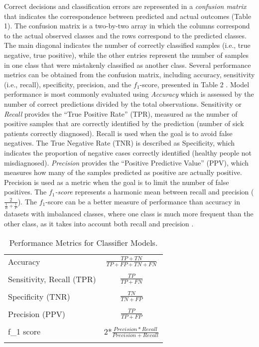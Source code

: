 \documentclass[sigconf]{acmart}
\begin{document}
Correct decisions and classification errors are represented in a 
\emph{confusion matrix} that indicates the correspondence between predicted 
and actual outcomes (Table 1). The confusion matrix is a two-by-two array in 
which the columns correspond to the actual observed classes and the rows 
correspond to the predicted classes. The main diagonal indicates the number 
of correctly classified samples (i.e., true negative, true positive), while 
the other entries represent the number of samples in one class that were 
mistakenly classified as another class. Several performance metrics can be 
obtained from the confusion matrix, including accuracy, sensitivity (i.e., 
recall), specificity, precision, and the $f_1$-score, presented in Table 2 
\cite{kuhn13, wiki18}. Model performance is most commonly evaluated using 
\emph{Accuracy} which is assessed by the number of correct predictions 
divided by the total observations. Sensitivity or \emph{Recall} provides the 
``True Positive Rate'' (TPR), measured as the number of positive samples that 
are correctly identified by the prediction (number of sick patients correctly
diagnosed). Recall is used when the goal is to avoid false negatives. The 
True Negative Rate (TNR) is described as Specificity, which indicates the 
proportion of negative cases correctly identified (healthy people not 
misdiagnosed). \emph{Precision} provides the ``Positive Predictive Value'' 
(PPV), which measures how many of the samples predicted as positive are 
actually positive. Precision is used as a metric when the goal is to limit
the number of false positives. The \emph{$f_1$-score} represents a harmonic 
mean between recall and precision (\(\frac{2}{ \frac{1}{R} + \frac{1}{P} }\)). 
The $f_1$-score can be a better measure of performance than accuracy in 
datasets with imbalanced classes, where one class is much more frequent 
than the other class, as it takes into account both recall and precision 
\cite{muller17, yun09}.


\begin{table}
  \caption{Performance Metrics for Classifier Models.}
  \label{tab:freq}
  \begin{tabular}{lc}
    \toprule
    Accuracy & \(\frac{TP+TN}{TP+FP+TN+FN}\) \\
    & \\
    Sensitivity, Recall (TPR) &  \(\frac{TP}{TP+FN}\) \\
    & \\
    Specificity (TNR) &  \(\frac{TN}{TN+FP}\) \\
    & \\
    Precision (PPV) & \(\frac{TP}{TP+FP}\)  \\
    & \\
    f_1 score & 2*\(\frac{Precision*Recall}{Precision+Recall}\) \\
    & \\
    \bottomrule
  \end{tabular}
\end{table}
\end{document}
